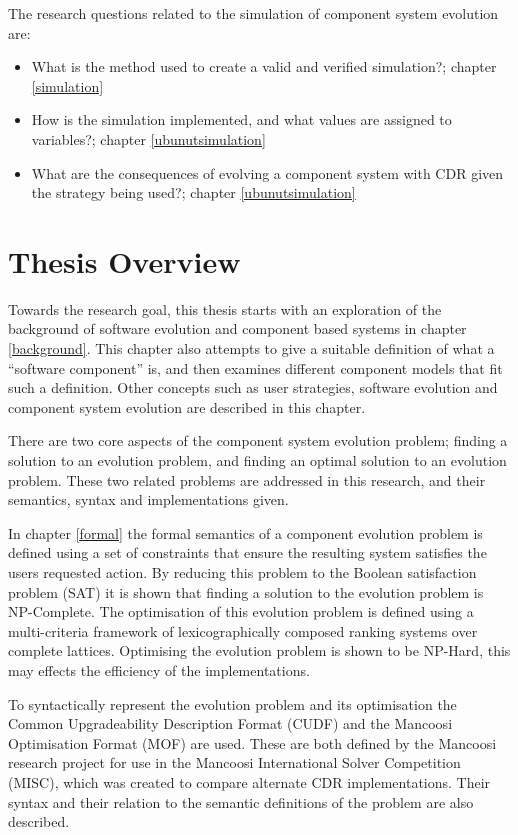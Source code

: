 The research questions related to the simulation of component system evolution are: 
\begin{itemize}
	\item What is the method used to create a valid and verified simulation?;  chapter \ref{simulation}
	\item How is the simulation implemented, and what values are assigned to variables?;  chapter \ref{ubunutsimulation}
	\item What are the consequences of evolving a component system with CDR given the strategy being used?;  chapter \ref{ubunutsimulation}
\end{itemize}

\section{Thesis Overview}
Towards the research goal, this thesis starts with an exploration of the background of software evolution and component based systems in chapter \ref{background}.
This chapter also attempts to give a suitable definition of what a ``software component'' is, and then examines different component models that fit such a definition.
Other concepts such as user strategies, software evolution and component system evolution are described in this chapter.

There are two core aspects of the component system evolution problem; 
finding a solution to an evolution problem, and finding an optimal solution to an evolution problem.
These two related problems are addressed in this research, and their semantics, syntax and implementations given.

In chapter \ref{formal} the formal semantics of a component evolution problem is defined using a set of constraints that ensure the resulting system satisfies the users requested action.
By reducing this problem to the Boolean satisfaction problem (SAT) it is shown that finding a solution to the evolution problem is NP-Complete.
The optimisation of this evolution problem is defined using a multi-criteria framework of lexicographically composed ranking systems over complete lattices.
Optimising the evolution problem is shown to be NP-Hard, this may effects the efficiency of the implementations.

To syntactically represent the evolution problem and its optimisation the Common Upgradeability Description Format (CUDF) and the Mancoosi Optimisation Format (MOF) are used.
These are both defined by the Mancoosi research project for use in the Mancoosi International Solver Competition (MISC), 
which was created to compare alternate CDR implementations.
Their syntax and their relation to the semantic definitions of the problem are also described.

